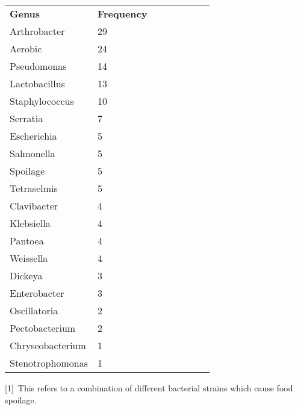 \documentclass[11pt]{article}
\begin{document}
\begin{table}[htbp]
\begin{tabularx}{\linewidth}{l*{7}{Y}}
					\midrule
		\textbf{Genus} & \textbf{Frequency} \\
		Arthrobacter & 29 \\
		Aerobic & 24 \\
		Pseudomonas & 14 \\
		Lactobacillus & 13 \\
		Staphylococcus & 10 \\
		Serratia & 7 \\
		Escherichia & 5 \\
		Salmonella & 5 \\
		Spoilage & 5 \\
		Tetraselmis & 5 \\
		Clavibacter & 4 \\
		Klebsiella & 4 \\
		Pantoea & 4 \\
		Weissella & 4 \\
		Dickeya & 3 \\
		Enterobacter & 3 \\
		Oscillatoria & 2 \\
		Pectobacterium & 2 \\
		Chryseobacterium & 1 \\
		Stenotrophomonas & 1 \\
		\bottomrule
	\end{tabularx}
		
		[1]\ This refers to a combination of different bacterial strains which cause food spoilage.
	\end{table}
	
\end{document}
